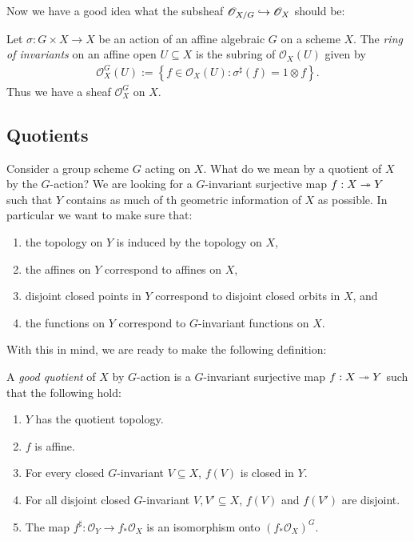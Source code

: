 \documentclass[12pt]{ociamthesis}  %
\begin{document}
Now we have a good idea what the subsheaf
$\mathscr O_{X/G}\hookrightarrow\mathscr O_X$ should be:
\begin{definition}
  Let $\sigma : G\times X \to X$ be an action of an affine algebraic
  $G$ on a scheme $X$. The \emph{ring of invariants}
  on an affine open $U\subseteq X$ is the subring of $\mathscr O_X(U)$
  given by
  \begin{align*}
    \mathscr O_X^G(U) :=
    \left\lbrace{f \in \mathscr O_X(U) : \sigma^\sharp(f) = 1 \otimes f}\right\rbrace.
  \end{align*}
  Thus we have a sheaf $\mathscr O_X^G$ on $X$.
\end{definition}

\begin{example}
  \missingexample
\end{example}

\subsection{Quotients}

Consider a group scheme $G$ acting on $X$. What do we mean by a
quotient of $X$ by the $G$-action? We are looking for a $G$-invariant
surjective map $f : X\twoheadrightarrow Y$ such that $Y$ contains as much of th
geometric information of $X$ as possible. In particular
we want to make sure that:
\begin{enumerate}
  \item the topology on $Y$ is induced by the topology on $X$,
  \item the affines on $Y$ correspond to affines on $X$,
  \item disjoint closed points in $Y$ correspond to disjoint
        closed orbits in $X$, and
  \item the functions on $Y$ correspond to $G$-invariant functions
        on $X$.
\end{enumerate}
With this in mind, we are ready to make the following definition:

\begin{definition}\label{def:good_quotient}
  A \emph{good quotient} of $X$ by $G$-action is a $G$-invariant
  surjective map $f : X\twoheadrightarrow Y$ such that the following hold:
  \begin{enumerate}
    \item $Y$ has the quotient topology.
    \item $f$ is affine.
    \item For every closed $G$-invariant $V\subseteq X$,
          $f(V)$ is closed in $Y$.
    \item For all disjoint closed $G$-invariant $V,V'\subseteq X$,
          $f(V)$ and $f(V')$ are disjoint.
    \item The map $f^\sharp : \mathscr O_Y \to f_*\mathscr O_X$
          is an isomorphism onto $(f_*\mathscr O_X)^G$.
  \end{enumerate}
\end{definition}
\end{document}
